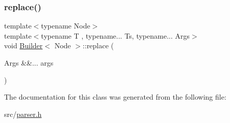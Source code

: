 \mbox{\label{class_builder_afa2c034e8301d162be0aa796188c56f8}} 
\subsubsection{\texorpdfstring{replace()}{replace()}\hspace{0.1cm}{\footnotesize\ttfamily [2/2]}}
{\footnotesize\ttfamily template$<$typename Node$>$ \\
template$<$typename T , typename... Ts, typename... Args$>$ \\
void \hyperlink{class_builder}{Builder}$<$ Node $>$\+::replace (\begin{DoxyParamCaption}\item[{Args \&\&...}]{args }\end{DoxyParamCaption})\hspace{0.3cm}{\ttfamily [inline]}}



The documentation for this class was generated from the following file\+:\begin{DoxyCompactItemize}
\item 
src/\hyperlink{parser_8h}{parser.\+h}\end{DoxyCompactItemize}
